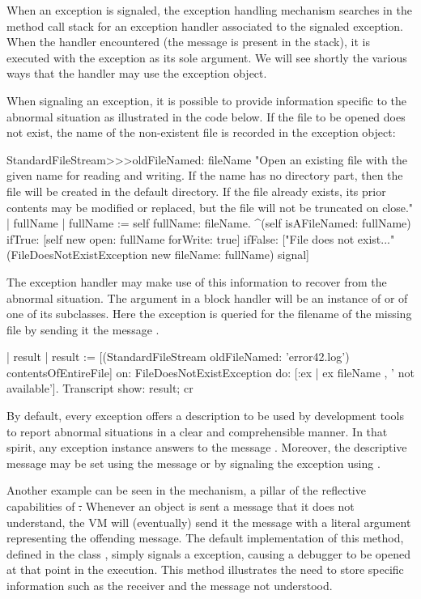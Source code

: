\documentclass[a4paper,10pt,twoside]{book}
\begin{document}
When an exception is signaled, the exception handling mechanism searches in the method call stack for an exception handler associated to the signaled exception. When the handler encountered (\ie the message  is present in the stack), it is executed with the exception as its sole argument. We will see shortly the various ways that the handler may use the exception object.

When signaling an exception, it is possible to provide information specific to the abnormal situation as illustrated in the code below. If the file to be opened does not exist, the name of the non-existent file is recorded in the exception object:

\begin{code}{}
StandardFileStream>>>oldFileNamed: fileName
	"Open an existing file with the given name for reading and writing. If the name has no directory part, then the file will be created in the default directory. If the file already exists, its prior contents may be modified or replaced, but the file will not be truncated on close."
	| fullName |
	fullName := self fullName: fileName.
	^(self isAFileNamed: fullName)
		ifTrue: [self new open: fullName forWrite: true]
		ifFalse: ["File does not exist..."
			(FileDoesNotExistException new fileName: fullName) signal]
\end{code}

The exception handler may make use of this information to recover from the abnormal situation. The argument  in a block handler \ct{[:ex | ...]} will be an instance of  or of one of its subclasses. Here the exception is queried for the filename of the missing file by sending it the message .

\begin{code}{}
| result |
result := [(StandardFileStream oldFileNamed: 'error42.log') contentsOfEntireFile]
	on: FileDoesNotExistException
	do: [:ex | ex fileName , ' not available'].
Transcript show: result; cr
\end{code}

By default, every exception offers a description to be used by development tools to report abnormal situations in a clear and comprehensible manner. In that spirit, any exception instance answers to the message . Moreover, the descriptive message may be set  using the message  or by signaling the exception using .

Another example can be seen in the  mechanism, a pillar of the reflective capabilities of \st. Whenever an object is sent a message that it does not understand, the VM will (eventually) send it the message  with a literal argument representing the offending message. The default implementation of this method, defined in the class , simply signals a  exception, causing a debugger to be opened at that point in the execution.
This method illustrates the need to store specific information such as the receiver and the message not understood.
\end{document}
